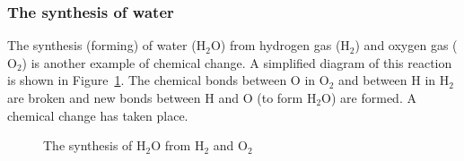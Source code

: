 \subsubsection*{The synthesis of water}
\label{m38709*id62788}The synthesis (forming) of water ($\text{H}_{2}\text{O}$) from hydrogen gas ($\text{H}_{2}$) and oxygen gas ($\text{O}_{2}$) is another example of chemical change. A simplified diagram of this reaction is shown in Figure~\ref{fig:chemical change:synthesis}. The chemical bonds between $\text{O}$ in $\text{O}_{2}$ and between $\text{H}$ in $\text{H}_{2}$ are broken and new bonds between $\text{H}$ and $\text{O}$ (to form $\text{H}_{2}\text{O}$) are formed. A chemical change has taken place.\par 
    \setcounter{subfigure}{0}
\begin{figure}[h]
\begin{center}
\end{center}
\caption{The synthesis of $\text{H}_{2}\text{O}$ from $\text{H}_{2}$ and $\text{O}_{2}$}
\label{fig:chemical change:synthesis}
\end{figure} 
\label{m38709*secfhsst!!!underscore!!!id163}
